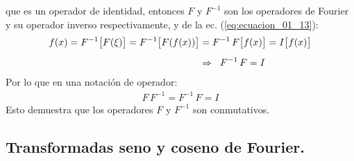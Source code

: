 que es un operador de identidad, entonces $F$ y $F^{-1}$ son los operadores de Fourier y
su operador inverso respectivamente, y de la ec. (\ref{eq:ecuacion_01_13}):
\begin{align}
\begin{aligned}[b]
f(x) = F^{-1} \big[F(\xi)\big] = F^{-1} \big[F(f(x))\big] &= F^{-1} \, F \big[f(x)\big] = I \big[f(x)\big] \\[0.5em]
&\Rightarrow \hspace{0.2cm} F^{-1} \, F = I
\end{aligned}
\label{eq:ecuacion_01_16}
\end{align}
Por lo que en una notación de operador:
\begin{align*}
F \, F^{-1} = F^{-1} \, F = I
\end{align*}
Esto demuestra que los operadores $F$ y $F^{-1}$ son conmutativos.

\subsection{Transformadas seno y coseno de Fourier.}


